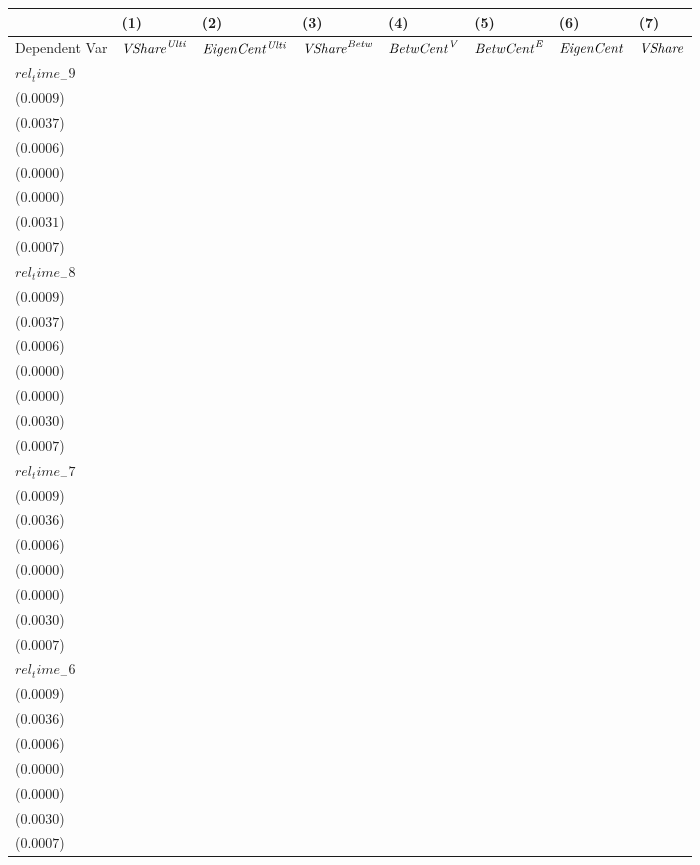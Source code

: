 \begin{tabular}{llllllll}
\toprule
 & (1) & (2) & (3) & (4) & (5) & (6) & (7) \\
\midrule
Dependent Var & ${\it {VShare}^{\it Ulti}}$ & ${\it EigenCent^{\it Ulti}}$ & ${\it VShare}^{\it Betw}$ & ${\it BetwCent}^{\it V}$ & ${\it BetwCent}^{\it E}$ & ${\it EigenCent}$ & ${\it VShare}$ \\
$rel_time_-9$ & \makecell{$-0.0011^{}$ \\ ($0.0009$)} & \makecell{$-0.0020^{}$ \\ ($0.0037$)} & \makecell{$-0.0028^{***}$ \\ ($0.0006$)} & \makecell{$-0.0002^{***}$ \\ ($0.0000$)} & \makecell{$-0.0001^{***}$ \\ ($0.0000$)} & \makecell{$-0.0040^{}$ \\ ($0.0031$)} & \makecell{$-0.0013^{*}$ \\ ($0.0007$)} \\
$rel_time_-8$ & \makecell{$-0.0029^{***}$ \\ ($0.0009$)} & \makecell{$-0.0133^{***}$ \\ ($0.0037$)} & \makecell{$-0.0033^{***}$ \\ ($0.0006$)} & \makecell{$-0.0003^{***}$ \\ ($0.0000$)} & \makecell{$-0.0001^{***}$ \\ ($0.0000$)} & \makecell{$-0.0140^{***}$ \\ ($0.0030$)} & \makecell{$-0.0032^{***}$ \\ ($0.0007$)} \\
$rel_time_-7$ & \makecell{$0.0003^{}$ \\ ($0.0009$)} & \makecell{$0.0019^{}$ \\ ($0.0036$)} & \makecell{$-0.0025^{***}$ \\ ($0.0006$)} & \makecell{$-0.0002^{***}$ \\ ($0.0000$)} & \makecell{$-0.0001^{***}$ \\ ($0.0000$)} & \makecell{$-0.0006^{}$ \\ ($0.0030$)} & \makecell{$-0.0003^{}$ \\ ($0.0007$)} \\
$rel_time_-6$ & \makecell{$0.0001^{}$ \\ ($0.0009$)} & \makecell{$-0.0006^{}$ \\ ($0.0036$)} & \makecell{$0.0003^{}$ \\ ($0.0006$)} & \makecell{$-0.0001^{}$ \\ ($0.0000$)} & \makecell{$0.0000^{}$ \\ ($0.0000$)} & \makecell{$-0.0023^{}$ \\ ($0.0030$)} & \makecell{$-0.0002^{}$ \\ ($0.0007$)} \\

\end{tabular}
